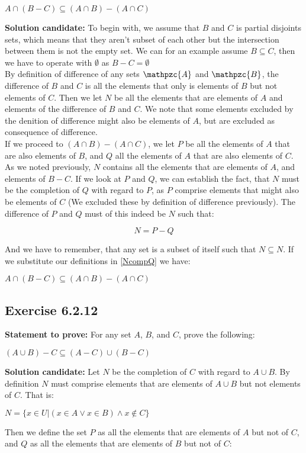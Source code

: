 \documentclass{report}
\newcommand{\cent}[1]{\begin{center}#1\end{center}}
\newcommand{\mat}[2]{\begin{equation} \label{#2}#1\end{equation}}
\newcommand{\In}{\! \in \!}
\newcommand{\script}[1]{\mathpzc{#1}}
\newcommand{\Prove}{\textbf{Statement to prove: }}
\newcommand{\Solution}{\textbf{Solution candidate: }}
\newcommand{\QED}{\boxed{}}
\newcommand{\Exercise}[1]{\subsection{Exercise #1}}
\begin{document}
	\cent{$ A \cap (B-C) \subseteq (A \cap B) - (A \cap C) $}
	
	\Solution
	To begin with, we assume that $B$ and $C$ is partial disjoints sets, which means that they aren't subset of each other but the intersection between them is not the empty set. We can for an example assume $B \subseteq C$, then we have to operate with $\emptyset$ as $B - C = \emptyset$\\
	
	By definition of difference of any sets $\script{A}$ and $ \script{B} $, the difference of $B$ and $C$ is all the elements that only is elements of $B$ but not elements of $C$. Then we let $N$ be all the elements that are elements of $A$ and elements of the difference of $B$ and $C$. We note that some elements excluded by the denition of difference might also be elements of $A$, but are excluded as consequence of difference.\\
	
	If we proceed to $(A \cap B) - (A \cap C)$, we let $P$ be all the elements of $A$ that are also elements of $B$, and $Q$ all the elements of $A$ that are also elements of $C$. As we noted previously, $N$ contains all the elements that are elements of $A$, and elements of $B -C$. If we look at $P$ and $Q$, we can establish the fact, that $N$ must be the completion of $Q$ with regard to $P$, as $P$ comprise elements that might also be elements of $C$ (We excluded these by definition of difference previously). The difference of $P$ and $Q$ must of this indeed be $N$ such that:
	
	\mat{N = P-Q}{NcompQ}
	
	And we have to remember, that any set is a subset of itself such that  $N \subseteq N$. If we substitute our definitions in \eqref{NcompQ} we have:
	\cent{$ A \cap (B-C) \subseteq (A \cap B) - (A \cap C) $}
	
	\QED
	
	\Exercise{6.2.12}
	
	\Prove
	For any set $A$, $B$, and $C$, prove the following:
	
	\cent{$(A \cup B) - C \subseteq (A-C) \cup (B-C)$}
	
	\Solution
	Let $N$ be the completion of $C$ with regard  to $A\cup B$. By definition $N$ must comprise elements that are elements of $A \cup B$ but not elements of $C$. That is:
	
	\cent{$ N = \{x \In U | (x \In A \vee x \In B) \wedge x \notin C\} $}
	
	Then we define the set $P$ as all the elements that are elements of $A$ but not of $C$, and $Q$ as all the elements that are elements of $B$ but not of $C$:
	
\end{document}

